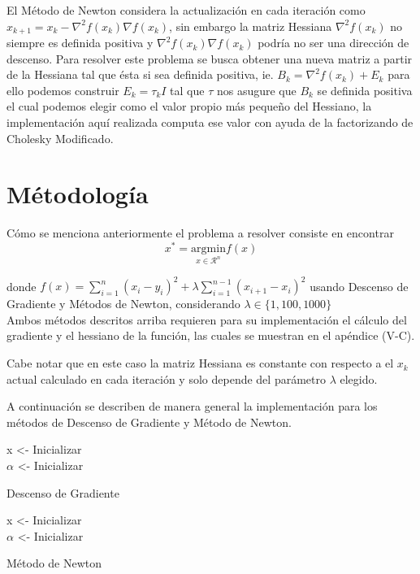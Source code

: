 \documentclass[conference]{IEEEtran}
\begin{document}
El Método de Newton considera la actualización en cada iteración como
$x_{k+1} = x_k - \nabla^2 f(x_k) \nabla f(x_k)$, sin embargo la matriz Hessiana
$\nabla^2f(x_k)$ no siempre es definida positiva y $\nabla^2 f(x_k) \nabla f(x_k)$
podría no ser una dirección de descenso. Para resolver este problema se busca
obtener una nueva matriz a partir de la Hessiana tal que ésta si sea definida
positiva, ie. $B_k = \nabla^2f(x_k) + E_k$ para ello podemos construir
$E_k = \tau_kI$ tal que $\tau$ nos asugure que $B_k$ se definida positiva el cual
podemos elegir como el valor propio más pequeño del Hessiano, la implementación
aquí realizada computa ese valor con ayuda de la factorizando de Cholesky
Modificado.

\section{Métodología}

Cómo se menciona anteriormente el problema a resolver consiste en encontrar
$$
	x^* = \underset{x \in \mathcal{R}^n}{\mathrm{argmin}} f(x)
$$

donde $f(x) = \sum_{i=1}^{n} (x_i-y_i)^2 + \lambda \sum_{i=1}^{n-1} (x_{i+1} - x_i)^2$
usando Descenso de Gradiente y Métodos de Newton,
considerando $\lambda \in \{1, 100, 1000\}$ \\

Ambos métodos descritos arriba requieren para su implementación el cálculo
del gradiente y el hessiano de la función, las cuales se muestran en el
apéndice (V-C).

Cabe notar que en este caso la matriz Hessiana es constante con respecto a el
$x_k$ actual calculado en cada iteración y solo depende del parámetro $\lambda$
elegido.

A continuación se describen de manera general la implementación para los métodos
de Descenso de Gradiente y Método de Newton.

\begin{algorithm}[]
	\SetAlgoLined
	x <- Inicializar \\
	$\alpha$ <- Inicializar \\
	 \caption{Descenso de Gradiente}
\end{algorithm}
\begin{algorithm}[]
	\SetAlgoLined
	x <- Inicializar \\
	$\alpha$ <- Inicializar \\
	 \caption{Método de Newton}
\end{algorithm}
\end{document}
